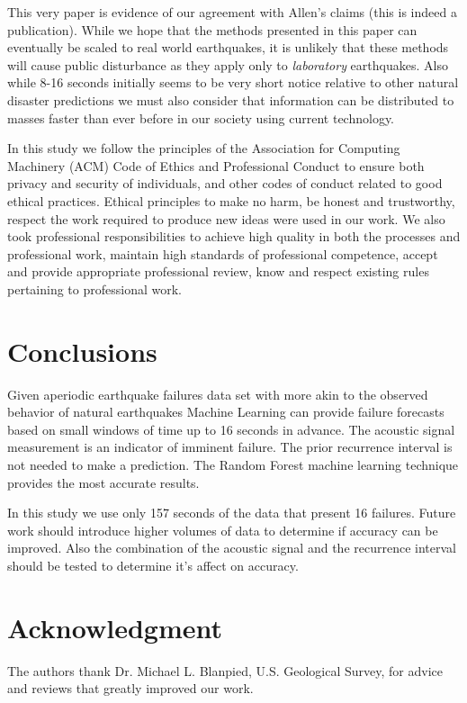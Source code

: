 \documentclass[]{llncs} %
\begin{document}
This very paper is evidence of our agreement with Allen's claims (this is indeed a publication). While we hope that the methods presented in this paper can eventually be scaled to real world earthquakes, it is unlikely that these methods will cause public disturbance as they apply only to \emph{laboratory} earthquakes. Also while 8-16 seconds initially seems to be very short notice relative to other natural disaster predictions we must also consider that information can be distributed to masses faster than ever before in our society using current technology.  \par

In this study we follow the principles of the Association for Computing Machinery (ACM) Code of Ethics and Professional Conduct \cite{ACM} to ensure both privacy and security of individuals, and other codes of conduct related to good ethical practices. Ethical principles to make no harm, be honest and trustworthy, respect the work required to produce new ideas were used in our work. We also took professional responsibilities to achieve high quality in both the processes and professional work, maintain high standards of professional competence, accept and provide appropriate professional review, know and respect existing rules pertaining to professional work. \par

\section{Conclusions}

Given aperiodic earthquake failures data set with more akin to the observed behavior of natural earthquakes Machine Learning can provide failure forecasts based on small windows of time up to 16 seconds in advance. The acoustic signal measurement is an indicator of imminent failure. The prior recurrence interval is not needed to make a prediction. The Random Forest machine learning technique provides the most accurate results.

In this study we use only 157 seconds of the data that present 16 failures. Future work should introduce higher volumes of data to determine if accuracy can be improved. Also the combination of the acoustic signal and the recurrence interval should be tested to determine it's affect on accuracy.

\section{Acknowledgment}
The authors thank Dr. Michael L. Blanpied, U.S. Geological Survey, for advice and reviews that greatly improved our work.



\end{document}
